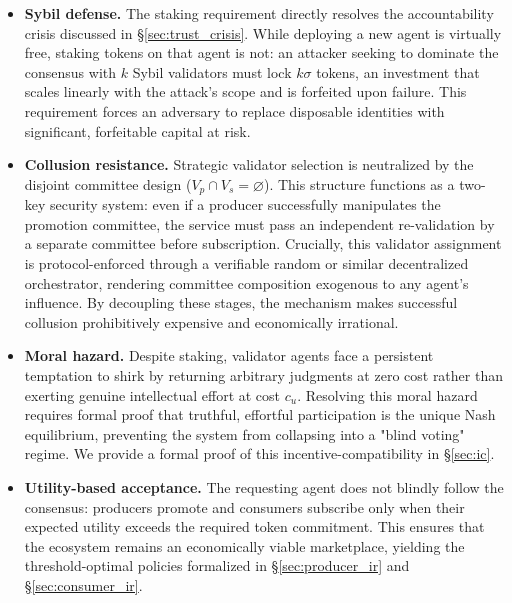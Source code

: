 \begin{itemize}[leftmargin=1.5em, itemsep=4pt]
\item \textbf{Sybil defense.} The staking requirement directly resolves the accountability crisis discussed in \S\ref{sec:trust_crisis}. While deploying a new agent is virtually free, staking tokens on that agent is not: an attacker seeking to dominate the consensus with $k$ Sybil validators must lock $k\sigma$ tokens, an investment that scales linearly with the attack's scope and is forfeited upon failure. This requirement forces an adversary to replace disposable identities with significant, forfeitable capital at risk.

\item \textbf{Collusion resistance.} Strategic validator selection is neutralized by the disjoint committee design ($V_p \cap V_s = \varnothing$). This structure functions as a two-key security system: even if a producer successfully manipulates the promotion committee, the service must pass an independent re-validation by a separate committee before subscription. Crucially, this validator assignment is protocol-enforced through a verifiable random or similar decentralized orchestrator, rendering committee composition exogenous to any agent's influence. By decoupling these stages, the mechanism makes successful collusion prohibitively expensive and economically irrational.

\item \textbf{Moral hazard.} Despite staking, validator agents face a persistent temptation to shirk by returning arbitrary judgments at zero cost rather than exerting genuine intellectual effort at cost $c_u$. Resolving this moral hazard requires formal proof that truthful, effortful participation is the unique Nash equilibrium, preventing the system from collapsing into a "blind voting" regime. We provide a formal proof of this incentive-compatibility in \S\ref{sec:ic}.

\item \textbf{Utility-based acceptance.} The requesting agent does not blindly follow the consensus: producers promote and consumers subscribe only when their expected utility exceeds the required token commitment. This ensures that the ecosystem remains an economically viable marketplace, yielding the threshold-optimal policies formalized in \S\ref{sec:producer_ir} and \S\ref{sec:consumer_ir}.
\end{itemize}


